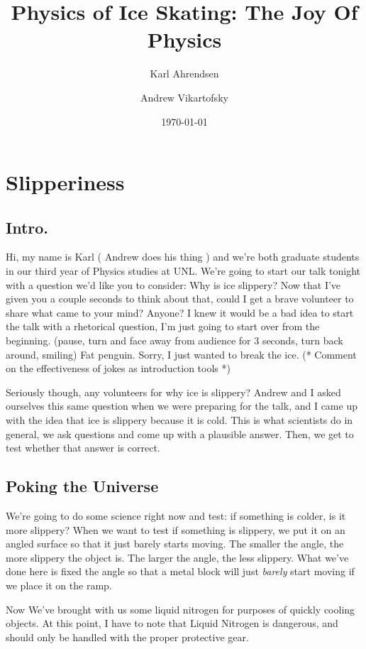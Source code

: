 \documentclass[12pt]{article}
\title{Physics of Ice Skating: The Joy Of Physics}
\author{Karl Ahrendsen \and Andrew Vikartofsky}
\date{\today}
\begin{document}
\maketitle
\section{Slipperiness}
\subsection{Intro.}
Hi, my name is Karl ( Andrew does his thing ) and we're both graduate
students in our third year of Physics studies at UNL. 
We're going to start our talk tonight with a question we'd like you to consider:
Why is ice slippery? Now that I've given you a couple seconds to think about that, 
could I get a brave volunteer to share what came to your mind? Anyone? I knew it would
be a bad idea to start the talk with a rhetorical question, I'm just going to start 
over from the beginning. (pause, turn and face away from audience for 3 seconds, 
turn back around, smiling) Fat penguin. Sorry, I just wanted to break the ice. 
(* Comment on the effectiveness of jokes as introduction tools *)
    
Seriously
though, any volunteers for why ice is slippery? Andrew and I asked ourselves
this same question when we were preparing for the talk, and I came up with the
idea that ice is slippery because it is cold. 
This is what scientists do in general, we ask questions and come up with a 
plausible answer. Then, we get to test whether that answer is correct. 

\subsection{Poking the Universe}
We're going to do some science right now 
and test: if something is colder, is it more slippery? When we want to test 
if something is slippery, we put it on an angled surface so that it just barely 
starts moving. The smaller the angle, the more slippery the object is. The 
larger the angle, the less slippery. 
What we've done here is fixed the angle so that a metal block will just \emph{barely}
start moving if we place it on the ramp. 

Now We've brought with us some 
liquid nitrogen for purposes of quickly cooling objects. 
At this point, I have to note that Liquid Nitrogen is 
dangerous, and should only be handled with the proper protective gear. 
\end{document}
